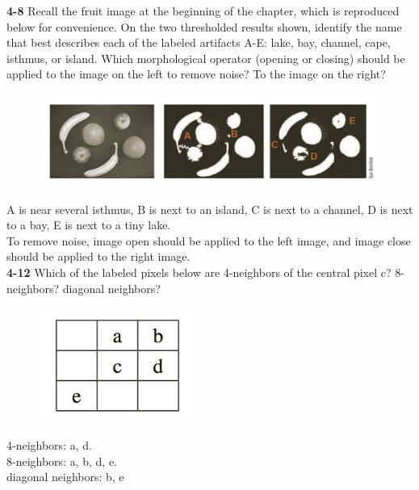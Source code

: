 \documentclass[a4paper]{article}
\begin{document}
\begin{spacing}{2.0}
	\noindent
	\textbf{4-8} Recall the fruit image at the beginning of the chapter, which is reproduced below for convenience. On the two thresholded results shown, identify the name that best describes each of the labeled artifacts A-E: lake, bay, channel, cape, isthmus, or island. Which morphological operator (opening or closing) should be applied to the image on the left to remove noise? To the image on the right?
	\begin{figure}[H]
	\centering
	\includegraphics[width = 5in]{3.jpg}
	\end{figure}
	
	A is near several isthmus, B is next to an island, C is next to a channel, D is next to a bay, E is next to a tiny lake.\\
	To remove noise, image open should be applied to the left image, and image close should be applied to the right image.\\


	\noindent
	\textbf{4-12} Which of the labeled pixels below are 4-neighbors of the central pixel c? 8-neighbors? diagonal neighbors? 
	\begin{figure}[H]
	\centering
	\includegraphics[width = 2in]{4.jpg}
	\end{figure}
	4-neighbors: a, d.\\ 8-neighbors: a, b, d, e. \\ diagonal neighbors: b, e\\
		

\end{spacing}
\end{document}
